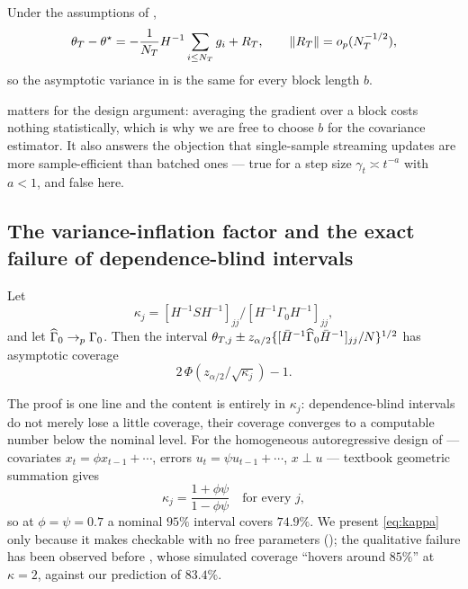 \begin{proposition}
\label{prop:blockfree}
Under the assumptions of ,
\[
\theta_T-\theta^\star=-\frac{1}{N_T}H^{-1}\sum_{i\le N_T}g_i+R_T,
\qquad \lVert R_T \rVert=o_p(N_T^{-1/2}),
\]
so the asymptotic variance in  is the same for every block length $b$.
\end{proposition}

 matters for the design argument: averaging the gradient over a block costs
nothing statistically, which is why we are free to choose $b$ for the covariance estimator. It also
answers the objection that single-sample streaming updates are more sample-efficient than batched ones
\citep{li2026stream} --- true for a step size $\gamma_t\asymp t^{-a}$ with $a<1$, and false here.

\subsection{The variance-inflation factor and the exact failure of dependence-blind intervals}

\begin{proposition}
\label{prop:coverage}
Let
\[
\kappa_j=\left[H^{-1}SH^{-1}\right]_{jj}\Big/\left[H^{-1}\Gamma_0H^{-1}\right]_{jj},
\]
and let $\widehat{\Gamma}_0\to_p\Gamma_0$. Then the interval
$\theta_{T,j}\pm z_{\alpha/2}\{[\bar{H}^{-1}\widehat{\Gamma}_0\bar{H}^{-1}]_{jj}/N\}^{1/2}$ has asymptotic coverage
\[
2\,\Phi\!\left(z_{\alpha/2}/\sqrt{\kappa_j}\right)-1 .
\]
\end{proposition}

The proof is one line and the content is entirely in $\kappa_j$: dependence-blind intervals do not
merely lose a little coverage, their coverage converges to a computable number below the nominal level.
For the homogeneous autoregressive design of  --- covariates $x_t=\phi x_{t-1}+\cdots$,
errors $u_t=\psi u_{t-1}+\cdots$, $x\perp u$ --- textbook geometric summation gives
\begin{equation}
\kappa_j=\frac{1+\phi\psi}{1-\phi\psi}\quad\text{for every }j,
\label{eq:kappa}
\end{equation}
so at $\phi=\psi=0.7$ a nominal $95\%$ interval covers $74.9\%$. We present \eqref{eq:kappa} only
because it makes  checkable with no free parameters (); the
qualitative failure has been observed before \citep{liu2023mixing}, whose simulated coverage ``hovers
around $85\%$'' at $\kappa=2$, against our prediction of $83.4\%$.
